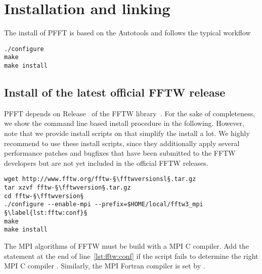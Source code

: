 \chapter{Installation and linking}\label{chap:inst}

The install of PFFT is based on the Autotools and follows the typical workflow
\begin{lstlisting}[escapechar=§]
./configure
make
make install
\end{lstlisting}


\section{Install of the latest official FFTW release}\label{sec:fftw_inst}
PFFT depends on Release~\fftwversion{} of the FFTW library~\cite{fftw}.
For the sake of completeness, we show the command line based install procedure in the following.
However, note that we provide install scripts on \websoft that simplify the install a lot.
We highly recommend to use these install scripts, since they additionally apply several
performance patches and bugfixes that have been submitted to the FFTW developers but
are not yet included in the official FFTW releases.
\begin{lstlisting}[escapechar=§]
wget http://www.fftw.org/fftw-§\fftwversionsl§.tar.gz
tar xzvf fftw-§\fftwversion§.tar.gz
cd fftw-§\fftwversion§
./configure --enable-mpi --prefix=$HOME/local/fftw3_mpi §\label{lst:fftw:conf}§
make
make install
\end{lstlisting}
The MPI algorithms of FFTW must be build with a MPI C compiler. Add the statement 
at the end of line~\ref{lst:fftw:conf} if the  script fails to determine the right
MPI C compiler . Similarly, the MPI Fortran compiler  is set by .

